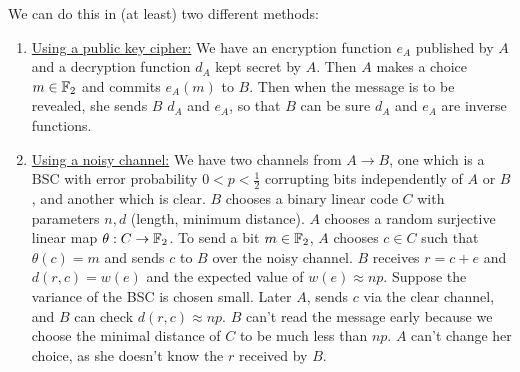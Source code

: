\documentclass[10pt,a4paper]{article}
\begin{document}
We can do this in (at least) two different methods:
\begin{enumerate}
\item \underline{Using a public key cipher:} We have an encryption function $e_A$ published by $A$ and a decryption function $d_A$ kept secret by $A$. Then $A$ makes a choice $m \in \mathbb{F}_2$ and commits $e_A(m)$ to $B$. Then when the message is to be revealed, she sends $B$ $d_A$ and $e_A$, so that $B$ can be sure $d_A$ and $e_A$ are inverse functions.
\item \underline{Using a noisy channel:} We have two channels from $A \to B$, one which is a BSC with error probability $0<p<\frac12$ corrupting bits independently of $A$ or $B$, and another which is clear. $B$ chooses a binary linear code $C$ with parameters $n,d$ (length, minimum distance). $A$ chooses a random surjective linear map $\theta : C \to \mathbb{F}_2$. To send a bit $m \in \mathbb{F}_2$, $A$ chooses $c \in C$ such that $\theta(c) = m$ and sends $c$ to $B$ over the noisy channel. $B$ receives $r = c+e$ and $d(r,c) = w(e)$ and the expected value of $w(e) \approx np$. Suppose the variance of the BSC is chosen small. Later $A$, sends $c$ via the clear channel, and $B$ can check $d(r,c) \approx np$. $B$ can't read the message early because we choose the minimal distance of $C$ to be much less than $np$. $A$ can't change her choice, as she doesn't know the $r$ received by $B$.
\end{enumerate}
\end{document}
